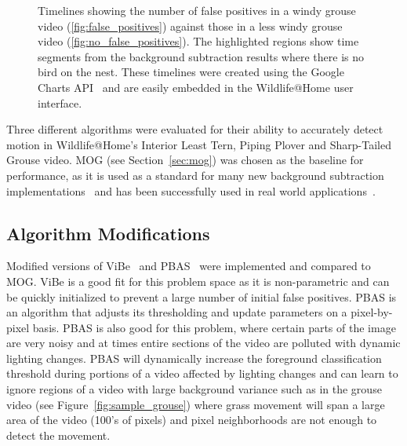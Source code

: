 \begin{sidewaysfigure}[!t]
\centering
{}
\hfil
{}
\caption{Timelines showing the number of false positives in a windy grouse video (\ref{fig:false_positives}) against those in a less windy grouse video (\ref{fig:no_false_positives}). The highlighted regions show time segments from the background subtraction results where there is no bird on the nest. These timelines were created using the Google Charts API~\cite{google_2015_charts} and are easily embedded in the Wildlife@Home user interface.}
\label{fig:false_positives_example}
\end{sidewaysfigure}

Three different algorithms were evaluated for their ability to accurately detect motion in Wildlife@Home's Interior Least Tern, Piping Plover and Sharp-Tailed Grouse video. MOG (see Section~\ref{sec:mog}) was chosen as the baseline for performance, as it is used as a standard for many new background subtraction implementations~\cite{ko_2008_background, piccardi_2004_background, mcivor_2000_background, hofmann_2012_background, elgammal_2000_non, kim_2005_real} and has been successfully used in real world applications~\cite{sen_2004_robust}.


\subsection{Algorithm Modifications}
\label{sec:alg_mods}

Modified versions of ViBe~\cite{van_2014_vibe} and PBAS~\cite{hofmann_2012_background} were implemented and compared to MOG\@. ViBe is a good fit for this problem space as it is non-parametric and can be quickly initialized to prevent a large number of initial false positives. PBAS is an algorithm that adjusts its thresholding and update parameters on a pixel-by-pixel basis. PBAS is also good for this problem, where certain parts of the image are very noisy and at times entire sections of the video are polluted with dynamic lighting changes. PBAS will dynamically increase the foreground classification threshold during portions of a video affected by lighting changes and can learn to ignore regions of a video with large background variance such as in the grouse video (see Figure~\ref{fig:sample_grouse}) where grass movement will span a large area of the video (100's of pixels) and pixel neighborhoods are not enough to detect the movement.

